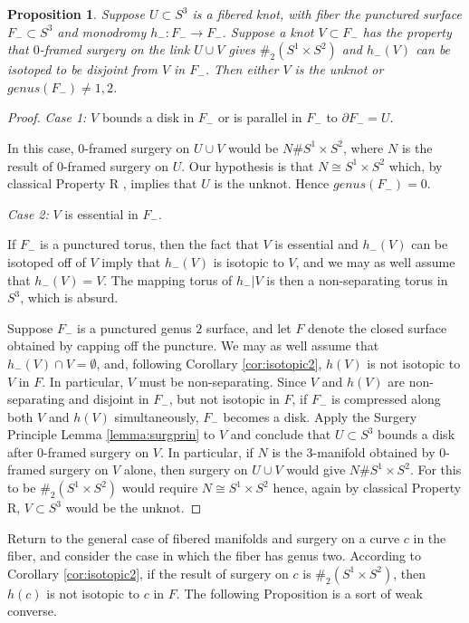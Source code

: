 \documentclass{amsart}
\newtheorem{prop}[thm]{Proposition}
\newcommand{\bdd}{\mbox{$\partial$}}
\begin{document}
\begin{prop}  \label{prop:strictmono} Suppose $U \subset S^3$ is a fibered knot, with fiber the punctured surface $F_- \subset S^3$ and monodromy $h_-: F_- \to F_-$.  Suppose a knot $V \subset F_-$ has the property that $0$-framed surgery on the link $U \cup V$ gives $\#_{2} (S^{1} \times S^{2})$ and $h_-(V)$ can be isotoped to be disjoint from $V$ in $F_-$.  Then either $V$ is the unknot or $genus(F_-) \neq 1, 2$.  \end{prop}

\begin{proof}  {\em Case 1:} $V$ bounds a disk in $F_-$ or is parallel in $F_-$ to $\bdd F_- = U$.

In this case, $0$-framed surgery on $U \cup V$ would be $N \# S^1 \times S^2$, where $N$ is the result of $0$-framed surgery on $U$.  Our hypothesis is that $N \cong S^1 \times S^2$ which, by classical Property R \cite{Ga1}, implies that $U$ is the unknot.  Hence $genus(F_-) = 0$.

\bigskip

{\em Case 2:} $V$ is essential in $F_-$.

If $F_-$ is a punctured torus, then the fact that $V$ is essential and $h_-(V)$ can be isotoped off of $V$ imply that $h_-(V)$ is isotopic to $V$, and we may as well assume that $h_-(V) = V$.  The mapping torus of $h_-|V$ is then a non-separating torus in $S^3$, which is absurd.

Suppose $F_-$ is a punctured genus $2$ surface, and let $F$ denote the closed surface obtained by capping off the puncture.  We may as well assume that $h_-(V) \cap V = \emptyset$, and, following Corollary \ref{cor:isotopic2}, $h(V)$ is not isotopic to $V$ in $F$.  In particular, $V$ must be non-separating.   Since $V$ and $h(V)$ are non-separating and disjoint in $F_-$, but not isotopic in $F$, if $F_-$ is compressed along both $V$ and $h(V)$ simultaneously, $F_-$ becomes a disk.  Apply the Surgery Principle Lemma \ref{lemma:surgprin} to $V$ and conclude that $U \subset S^3$ bounds a disk after $0$-framed surgery on $V$.  In particular, if $N$ is the $3$-manifold obtained by $0$-framed surgery on $V$ alone, then surgery on $U \cup V$ would give $N \# S^1 \times S^2$.  For this to be $\#_{2} (S^{1} \times S^{2})$ would require $N \cong S^1 \times S^2$ hence, again by classical Property R, $V \subset S^3$ would be the unknot.
\end{proof}

Return to the general case of fibered manifolds and surgery on a curve $c$ in the fiber, and consider the case in which the fiber has genus two.  According to Corollary \ref{cor:isotopic2}, if the result of surgery on $c$ is $\#_{2} (S^{1} \times S^{2})$, then $h(c)$ is not isotopic to $c$ in $F$.   The following Proposition is a sort of weak converse.
\end{document}
